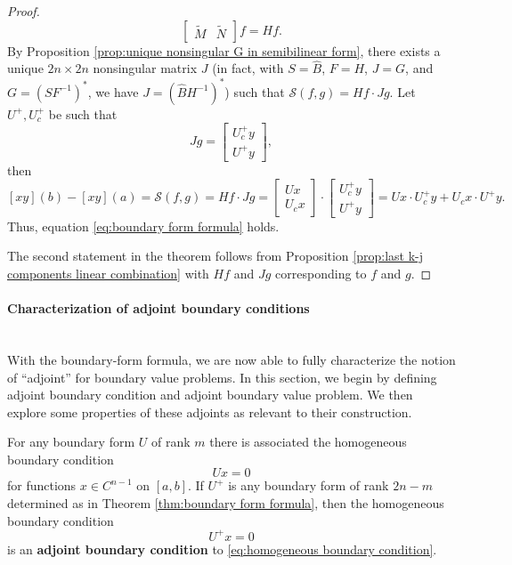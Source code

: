 \documentclass[12pt, oneside, a4paper]{article}
\begin{document}
\begin{proof}
\[\begin{bmatrix}
    \tilde{M} & \tilde{N}\end{bmatrix}f = Hf.\]
    By Proposition \ref{prop:unique nonsingular G in semibilinear form}, there exists a unique $2n\times 2n$ nonsingular matrix $J$ (in fact, with $S = \widehat{B}$, $F=H$, $J=G$, and $G=(SF^{-1})^*$, we have $J=(\widehat{B}H^{-1})^*$) such that $\mathcal{S}(f,g) = Hf\cdot Jg$. Let $U^+, U_c^+$ be such that
    \[Jg = \begin{bmatrix}U_c^+ y\\ U^+y\end{bmatrix},\]
    then 
    \[[xy](b)-[xy](a)=\mathcal{S}(f,g) = Hf\cdot Jg = \begin{bmatrix}Ux\\ U_cx\end{bmatrix}\cdot\begin{bmatrix}U_c^+ y \\ U^+y\end{bmatrix} = Ux\cdot U_c^+y + U_cx\cdot U^+y.\]
    Thus, equation \eqref{eq:boundary form formula} holds.

    The second statement in the theorem follows from Proposition \ref{prop:last k-j components linear combination} with $Hf$ and $Jg$ corresponding to $f$ and $g$.
\end{proof}

\paragraph{Characterization of adjoint boundary conditions}\mbox{}\\
With the boundary-form formula, we are now able to fully characterize the notion of ``adjoint'' for boundary value problems. In this section, we begin by defining adjoint boundary condition and adjoint boundary value problem. We then explore some properties of these adjoints as relevant to their construction.

\begin{defn}\cite[p.288-89]{CoddingtonLevinson}\label{defn:adjoint boundary condition}
    For any boundary form $U$ of rank $m$ there is associated the homogeneous boundary condition
    \begin{equation}\label{eq:homogeneous boundary condition}
        Ux=0
    \end{equation}
    for functions $x\in C^{n-1}$ on $[a,b]$. If $U^+$ is any boundary form of rank $2n-m$ determined as in Theorem \ref{thm:boundary form formula}, then the homogeneous boundary condition
    \begin{equation}\label{eq:adjoint boundary condition}
        U^+x=0
    \end{equation}
    is an \textbf{adjoint boundary condition} to \eqref{eq:homogeneous boundary condition}.
\end{defn}
\end{document}
